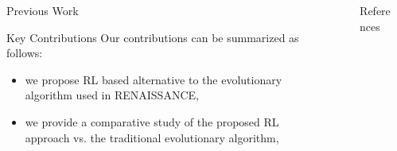 \documentclass[final]{beamer}
\newlength{\sepwidth}
\newlength{\colwidth}
\newcommand{\separatorcolumn}{\begin{column}{\sepwidth}\end{column}}
\begin{document}
\begin{frame}[t]
\begin{columns}[t]
\begin{column}{\colwidth}
\begin{block}{Previous Work}
    \end{block}

    \begin{block}{Key Contributions}
        Our contributions can be summarized as follows:
        \begin{itemize}
            \item we propose RL based alternative to the evolutionary algorithm used in RENAISSANCE,
            \item we provide a comparative study of the proposed RL approach vs. the traditional evolutionary algorithm,
        \end{itemize}
    \end{block}

\end{column}

\separatorcolumn
\begin{column}{\colwidth}

    
    \begin{block}{References}
        \nocite{*}
        \small{}
    \end{block}

\end{column}
\separatorcolumn

\end{columns}
\end{frame}
\end{document}
